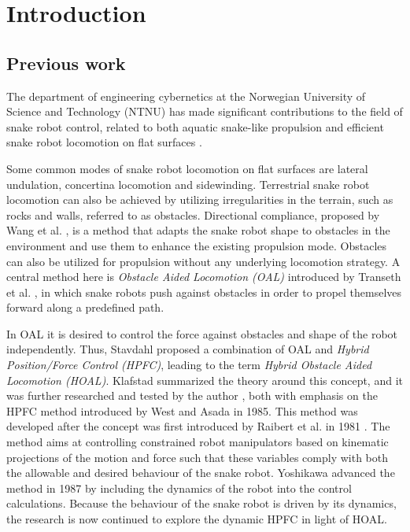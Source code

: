 
\chapter{Introduction}\label{Chapter:introduction}

\section{Previous work}

The department of engineering cybernetics at the Norwegian University of Science and Technology (NTNU) has made significant contributions to the field of snake robot control, related to both aquatic snake-like propulsion and efficient snake robot locomotion on flat surfaces \cite{StavdahlNote}.

Some common modes of snake robot locomotion on flat surfaces are lateral undulation, concertina locomotion and sidewinding. Terrestrial snake robot locomotion can also be achieved by utilizing irregularities in the terrain, such as rocks and walls, referred to as obstacles. Directional compliance, proposed by Wang et al. \cite{wang2020directional}, is a method that adapts the snake robot shape to obstacles in the environment and use them to enhance the existing propulsion mode. Obstacles can also be utilized for propulsion without any underlying locomotion strategy. A central method here is \textit{Obstacle Aided Locomotion (OAL)} introduced by Transeth et al. \cite{transeth2008snake}, in which snake robots push against obstacles in order to propel themselves forward along a predefined path.


In OAL it is desired to control the force against obstacles and shape of the robot independently. Thus, Stavdahl \cite{StavdahlNote} proposed a combination of OAL and \textit{Hybrid Position/Force Control (HPFC)}, leading to the term \textit{Hybrid Obstacle Aided Locomotion (HOAL)}. Klafstad \cite{TorjusOppg} summarized the theory around this concept, and it was further researched and tested by the author \cite{AtussaProsjektoppgp}, both with emphasis on the HPFC method introduced by West and Asada \cite{west1985method} in 1985. This method was developed after the concept was first introduced by Raibert et al. in 1981 \cite{raibert1981hybrid}. The method aims at controlling constrained robot manipulators based on kinematic projections of the motion and force such that these variables comply with both the allowable and desired behaviour of the snake robot. Yoshikawa \cite{yoshikawa1987dynamic} advanced the method in 1987 by including the dynamics of the robot into the control calculations. Because the behaviour of the snake robot is driven by its dynamics, the research is now continued to explore the dynamic HPFC in light of HOAL. 


